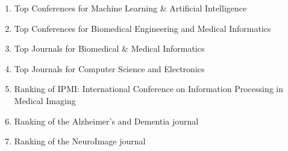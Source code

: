 \documentclass[11pt]{article}
\begin{document}
  \vspace{-7em}
  \begin{enumerate}
   \item Top Conferences for Machine Learning \& Artificial Intelligence\\
   \item Top Conferences for Biomedical Engineering and Medical Informatics\\
   \item Top Journals for Biomedical \& Medical Informatics\\
   \item Top Journals for Computer Science and Electronics\\
   \item Ranking of IPMI: International Conference on Information Processing in
Medical Imaging\\
   \item Ranking of the Alzheimer's and Dementia journal\\
   \item Ranking of the NeuroImage journal\\
  \end{enumerate}
  

  
  
 
\end{document}
